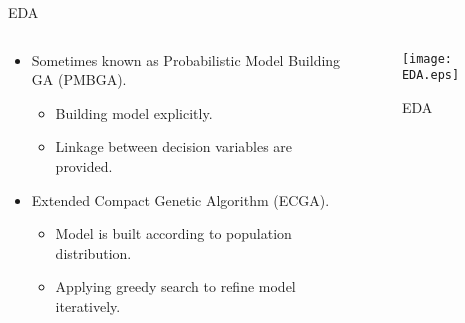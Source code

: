 \begin{frame}{EDA}
  \begin{columns}
    \begin{column}{.65\textwidth}
      \begin{itemize}
        \item Sometimes known as Probabilistic Model Building GA (PMBGA).
          \begin{itemize}
            \item Building model explicitly.
            \item Linkage between decision variables are provided.
          \end{itemize}
          \vspace*{14pt}
        \item  Extended Compact Genetic Algorithm (ECGA).
          \begin{itemize}
            \item Model is built according to population distribution.
            \item Applying greedy search to refine model iteratively.
          \end{itemize}
      \end{itemize}
    \end{column}
    \begin{column}{.35\textwidth}
      \begin{figure}[htp]
        \centering
        \texttt{[image: EDA.eps]}
        \caption{EDA}
      \end{figure}
    \end{column}
  \end{columns}
\end{frame}

